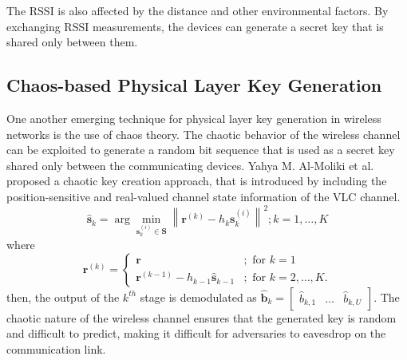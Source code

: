 The RSSI is also affected by the distance and other environmental factors. By exchanging RSSI measurements, the devices can generate a secret key that is shared only between them.

\subsection{Chaos-based Physical Layer Key Generation}
One another emerging technique for physical layer key generation in wireless networks is the use of chaos theory. The chaotic behavior of the wireless channel can be exploited to generate a random bit sequence that is used as a secret key shared only between the communicating devices. Yahya M. Al-Moliki et al. proposed a chaotic key creation approach, that is introduced by including the position-sensitive and real-valued channel state information of the VLC channel\cite{https://doi.org/10.1049/iet-opt.2018.5072}. 
\begin{equation}{\widehat {\mathbf{s}}_k} = \arg \mathop {\min }\limits_{{\mathbf{s}}_k^{(i)} \in {\mathbf{S}}} {\left\| {{{\mathbf{r}}^{(k)}} - {h_k}{\mathbf{s}}_k^{(i)}} \right\|^2};k = 1, \ldots ,K\end{equation}
where
\begin{equation}{{\mathbf{r}}^{(k)}} = \begin{cases} {\mathbf{r}}&{;{\text{ for }}k = 1} \\ {{{\mathbf{r}}^{(k - 1)}} - {h_{k - 1}}{{\widehat {\mathbf{s}}}_{k - 1}}}&{;{\text{ for }}k = 2, \ldots ,K.} \end{cases}\end{equation}
then, the output of the \(k^{th}\) stage is demodulated as \({{\hat{\mathbf b}}_k} = \left[ {\begin{array}{lll} {{{\hat b}_{k,1}}}& \ldots &{{{\hat b}_{k,U}}} \end{array}} \right]\).
The chaotic nature of the wireless channel ensures that the generated key is random and difficult to predict, making it difficult for adversaries to eavesdrop on the communication link.
